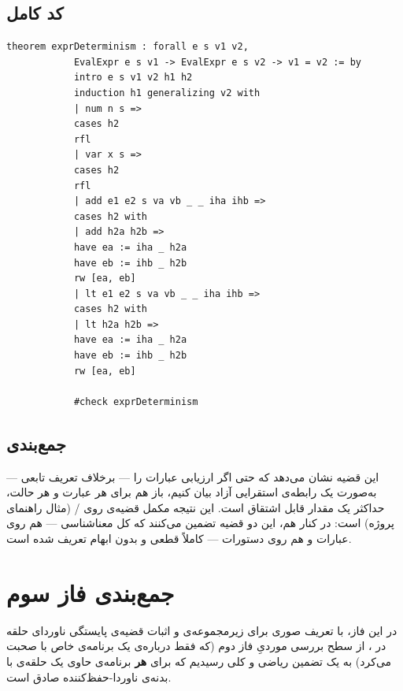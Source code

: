 \documentclass[12pt]{report}
\begin{document}
	\subsection{کد کامل}
	
	\begin{latin}
		\begin{lstlisting}[style=leanstyle]
			theorem exprDeterminism : forall e s v1 v2,
			EvalExpr e s v1 -> EvalExpr e s v2 -> v1 = v2 := by
			intro e s v1 v2 h1 h2
			induction h1 generalizing v2 with
			| num n s =>
			cases h2
			rfl
			| var x s =>
			cases h2
			rfl
			| add e1 e2 s va vb _ _ iha ihb =>
			cases h2 with
			| add h2a h2b =>
			have ea := iha _ h2a
			have eb := ihb _ h2b
			rw [ea, eb]
			| lt e1 e2 s va vb _ _ iha ihb =>
			cases h2 with
			| lt h2a h2b =>
			have ea := iha _ h2a
			have eb := ihb _ h2b
			rw [ea, eb]
			
			#check exprDeterminism
		\end{lstlisting}
	\end{latin}
	
	\subsection{جمع‌بندی}
	
	این قضیه نشان می‌دهد که حتی اگر ارزیابی عبارات را --- برخلاف تعریف تابعی  --- به‌صورت یک رابطه‌ی استقرایی آزاد بیان کنیم، باز هم برای هر عبارت و هر حالت، حداکثر یک مقدار قابل اشتقاق است. این نتیجه مکمل قضیه‌ی  روی / (مثال راهنمای پروژه) است: در کنار هم، این دو قضیه تضمین می‌کنند که کل معناشناسی  --- هم روی عبارات و هم روی دستورات --- کاملاً قطعی و بدون ابهام تعریف شده است.
	
	\section{جمع‌بندی فاز سوم}
	
	در این فاز، با تعریف صوری  برای زیرمجموعه‌ی  و اثبات قضیه‌ی پایستگی ناوردای حلقه در ، از سطح بررسی موردیِ فاز دوم (که فقط درباره‌ی یک برنامه‌ی خاص با  صحبت می‌کرد) به یک تضمین ریاضی و کلی رسیدیم که برای \textbf{هر} برنامه‌ی  حاوی یک حلقه‌ی  با بدنه‌ی ناوردا-حفظ‌کننده صادق است.
	
	
\end{document}
